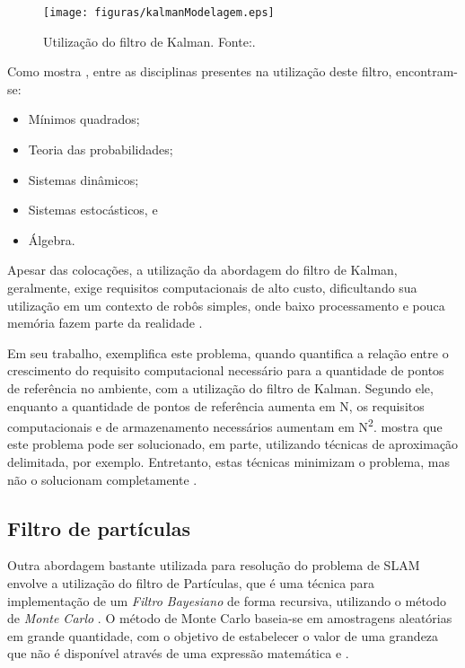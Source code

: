 \begin{figure}[H]
	\centering
	\texttt{[image: figuras/kalmanModelagem.eps]}
	\caption[Utilização do filtro de Kalman]{Utilização do filtro de Kalman. Fonte:\cite{agenteExploratorioKalman}.}
	\label{img:kalmanModelagem}
\end{figure}

Como mostra \cite{theCleaningProject}, entre as disciplinas presentes na utilização deste filtro, encontram-se:
\begin{itemize}
	\item Mínimos quadrados;
	\item Teoria das probabilidades;
	\item Sistemas dinâmicos;
	\item Sistemas estocásticos, e
	\item Álgebra.
\end{itemize}

Apesar das colocações, a utilização da abordagem do filtro de Kalman, geralmente, exige requisitos computacionais de alto custo, dificultando sua utilização em um contexto de robôs simples, onde baixo processamento e pouca memória fazem parte da realidade \cite{agenteExploratorioKalman}.

 Em seu trabalho, \cite{slamProblem} exemplifica este problema, quando quantifica a relação entre o crescimento do requisito computacional necessário para a quantidade de pontos de referência no ambiente, com a utilização do filtro de Kalman. Segundo ele, enquanto a quantidade de pontos de referência aumenta em N, os requisitos computacionais e de armazenamento necessários aumentam em N\textsuperscript{2}. \cite{slamProblem} mostra que este problema pode ser solucionado, em parte, utilizando técnicas de aproximação delimitada, por exemplo. Entretanto, estas técnicas minimizam o problema, mas não o solucionam completamente \cite{slamProblem}.


 \subsection{Filtro de partículas} %
 \label{sub:filtro_de_partículas}

Outra abordagem bastante utilizada para resolução do problema de SLAM envolve a utilização do filtro de Partículas, que é uma técnica para implementação de um \textit{Filtro Bayesiano} de forma recursiva, utilizando o método de \textit{Monte Carlo} \cite{integrationVisionSLAMnonlinear}. O método de Monte Carlo baseia-se em amostragens aleatórias em grande quantidade, com o objetivo de estabelecer o valor de uma grandeza que não é disponível através de uma expressão matemática \cite{mooney1997monte} e \cite{comparacaoKalmanParticulas}.

